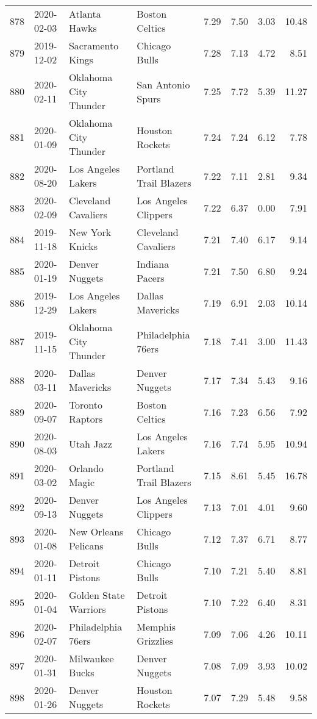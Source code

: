 \documentclass[
  11pt,
]{article}
\theoremstyle{nonumberplain}
\begin{document}
\begin{longtable}{rl|llr|rrr}
878 & 2020-02-03 & Atlanta Hawks & Boston Celtics & 7.29 & 7.50 & 3.03 & 10.48\\
879 & 2019-12-02 & Sacramento Kings & Chicago Bulls & 7.28 & 7.13 & 4.72 & 8.51\\
880 & 2020-02-11 & Oklahoma City Thunder & San Antonio Spurs & 7.25 & 7.72 & 5.39 & 11.27\\
881 & 2020-01-09 & Oklahoma City Thunder & Houston Rockets & 7.24 & 7.24 & 6.12 & 7.78\\
882 & 2020-08-20 & Los Angeles Lakers & Portland Trail Blazers & 7.22 & 7.11 & 2.81 & 9.34\\
883 & 2020-02-09 & Cleveland Cavaliers & Los Angeles Clippers & 7.22 & 6.37 & 0.00 & 7.91\\
884 & 2019-11-18 & New York Knicks & Cleveland Cavaliers & 7.21 & 7.40 & 6.17 & 9.14\\
885 & 2020-01-19 & Denver Nuggets & Indiana Pacers & 7.21 & 7.50 & 6.80 & 9.24\\
886 & 2019-12-29 & Los Angeles Lakers & Dallas Mavericks & 7.19 & 6.91 & 2.03 & 10.14\\
887 & 2019-11-15 & Oklahoma City Thunder & Philadelphia 76ers & 7.18 & 7.41 & 3.00 & 11.43\\
888 & 2020-03-11 & Dallas Mavericks & Denver Nuggets & 7.17 & 7.34 & 5.43 & 9.16\\
889 & 2020-09-07 & Toronto Raptors & Boston Celtics & 7.16 & 7.23 & 6.56 & 7.92\\
890 & 2020-08-03 & Utah Jazz & Los Angeles Lakers & 7.16 & 7.74 & 5.95 & 10.94\\
891 & 2020-03-02 & Orlando Magic & Portland Trail Blazers & 7.15 & 8.61 & 5.45 & 16.78\\
892 & 2020-09-13 & Denver Nuggets & Los Angeles Clippers & 7.13 & 7.01 & 4.01 & 9.60\\
893 & 2020-01-08 & New Orleans Pelicans & Chicago Bulls & 7.12 & 7.37 & 6.71 & 8.77\\
894 & 2020-01-11 & Detroit Pistons & Chicago Bulls & 7.10 & 7.21 & 5.40 & 8.81\\
895 & 2020-01-04 & Golden State Warriors & Detroit Pistons & 7.10 & 7.22 & 6.40 & 8.31\\
896 & 2020-02-07 & Philadelphia 76ers & Memphis Grizzlies & 7.09 & 7.06 & 4.26 & 10.11\\
897 & 2020-01-31 & Milwaukee Bucks & Denver Nuggets & 7.08 & 7.09 & 3.93 & 10.02\\
898 & 2020-01-26 & Denver Nuggets & Houston Rockets & 7.07 & 7.29 & 5.48 & 9.58\\

\end{longtable}
\end{document}
